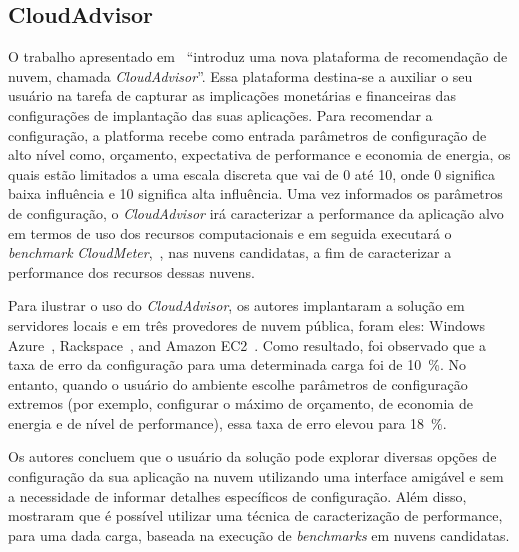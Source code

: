 \subsection{CloudAdvisor}
O trabalho apresentado em~\cite{jung2013cloudadvisor} ``introduz uma nova plataforma de recomendação de nuvem, chamada {\em CloudAdvisor}''. Essa plataforma destina-se a auxiliar o seu usuário na tarefa de capturar as implicações monetárias e financeiras das configurações de implantação das suas aplicações. Para recomendar a configuração, a platforma recebe como entrada parâmetros de configuração de alto nível como, orçamento, expectativa de performance e economia de energia, os quais estão limitados a uma escala discreta que vai de 0 até 10, onde 0 significa baixa influência e 10 significa alta influência. Uma vez informados os parâmetros de configuração, o {\em CloudAdvisor} irá caracterizar a performance da aplicação alvo em termos de uso dos recursos computacionais e em seguida executará o {\em benchmark} {\em CloudMeter},~\cite{jung2013cloudadvisor}, nas nuvens candidatas, a fim de caracterizar a performance dos recursos dessas nuvens.

Para ilustrar o uso do {\em CloudAdvisor}, os autores implantaram a solução em servidores locais e em três provedores de nuvem pública, foram eles: Windows Azure~\cite{azure}, Rackspace~\cite{rackspace}, and Amazon EC2~\cite{ec2}. Como resultado, foi observado que a taxa de erro da configuração para uma determinada carga foi de 10~\%. No entanto, quando o usuário do ambiente escolhe parâmetros de configuração extremos (por exemplo, configurar o máximo de orçamento, de economia de energia e de nível de performance), essa taxa de erro elevou para 18~\%.

Os autores concluem que o usuário da solução pode explorar diversas opções de configuração da sua aplicação na nuvem utilizando uma interface amigável e sem a necessidade de informar detalhes específicos de configuração. Além disso, mostraram que é possível utilizar uma técnica de caracterização de performance, para uma dada carga, baseada na execução de {\em benchmarks} em nuvens candidatas.

